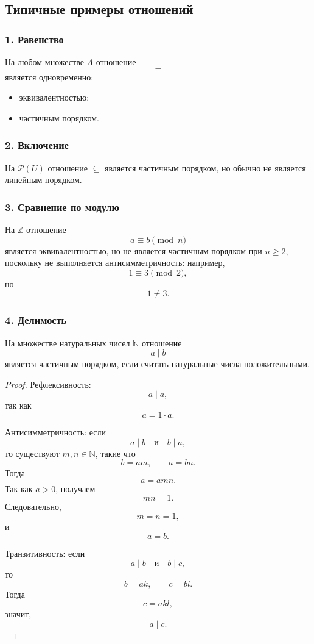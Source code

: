 \documentclass[12pt,a4paper]{article}
\begin{document}
\subsection{Типичные примеры отношений}

\subsubsection*{1. Равенство}

На любом множестве $A$ отношение
\[
=
\]
является одновременно:
\begin{itemize}
\item эквивалентностью;
\item частичным порядком.
\end{itemize}

\subsubsection*{2. Включение}

На $\mathcal P(U)$ отношение $\subseteq$ является частичным порядком, но обычно не является линейным порядком.

\subsubsection*{3. Сравнение по модулю}

На $\mathbb Z$ отношение
\[
a\equiv b\pmod n
\]
является эквивалентностью, но не является частичным порядком при $n\geq 2$, поскольку не выполняется антисимметричность:
например,
\[
1\equiv 3\pmod 2,
\]
но
\[
1\ne 3.
\]

\subsubsection*{4. Делимость}

На множестве натуральных чисел $\mathbb N$ отношение
\[
a\mid b
\]
является частичным порядком, если считать натуральные числа положительными.

\begin{proof}
Рефлексивность:
\[
a\mid a,
\]
так как
\[
a=1\cdot a.
\]

Антисимметричность:
если
\[
a\mid b
\quad\text{и}\quad
b\mid a,
\]
то существуют $m,n\in\mathbb N$, такие что
\[
b=am,\qquad a=bn.
\]
Тогда
\[
a=amn.
\]
Так как $a>0$, получаем
\[
mn=1.
\]
Следовательно,
\[
m=n=1,
\]
и
\[
a=b.
\]

Транзитивность:
если
\[
a\mid b
\quad\text{и}\quad
b\mid c,
\]
то
\[
b=ak,\qquad c=bl.
\]
Тогда
\[
c=akl,
\]
значит,
\[
a\mid c.
\]
\end{proof}
\end{document}
